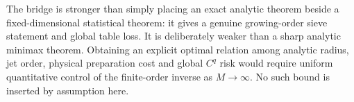 \begin{remark}
\label{rem:v23-global-bridge-scope}
The bridge is stronger than simply placing an exact analytic theorem beside a
fixed-dimensional statistical theorem: it gives a genuine growing-order
sieve statement and global table loss.  It is deliberately weaker than a
sharp analytic minimax theorem.  Obtaining an explicit optimal relation among
analytic radius, jet order, physical preparation cost and global \(C^q\) risk
would require uniform quantitative control of the finite-order inverse as
\(M\to\infty\).  No such bound is inserted by assumption here.
\end{remark}
